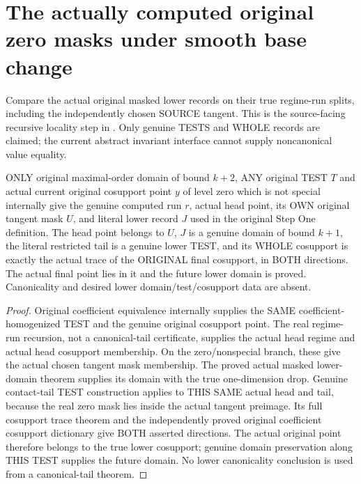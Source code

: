 \section{The actually computed original zero masks under smooth base change}

Compare the actual original masked lower records on their true regime-run
splits, including the independently chosen SOURCE tangent. This is the
source-facing recursive locality step in
\cite[Sections~5 and~7]{bierstone-milman08-functoriality}.
Only genuine TESTS and WHOLE records are claimed; the current abstract
invariant interface cannot supply noncanonical value equality.

\begin{lemma}
\label{hir:original-any-test-actual-computed-zero-mask-history}
\leanok
ONLY original maximal-order domain of bound $k+2$, ANY original TEST $T$
and actual current original cosupport point $y$ of level zero which is not
special internally give the genuine computed run $r$, actual head point,
its OWN original tangent mask $U$, and literal lower record $J$ used in
the original Step One definition. The head point belongs to $U$, $J$ is a
genuine domain of bound $k+1$, the literal restricted tail is a genuine
lower TEST, and its WHOLE cosupport is exactly the actual trace of the
ORIGINAL final cosupport, in BOTH directions. The actual final point lies
in it and the future lower domain is proved. Canonicality and desired
lower domain/test/cosupport data are absent.
\end{lemma}
\begin{proof}
Original coefficient equivalence internally supplies the SAME coefficient-
homogenized TEST and the genuine original cosupport point. The real regime-
run recursion, not a canonical-tail certificate, supplies the actual head
regime and actual head cosupport membership. On the zero/nonspecial branch,
these give the actual chosen tangent mask membership. The proved actual
masked lower-domain theorem supplies its domain with the true one-dimension
drop. Genuine contact-tail TEST construction applies to THIS SAME actual
head and tail, because the real zero mask lies inside the actual tangent
preimage. Its full cosupport trace theorem and the independently proved
original coefficient cosupport dictionary give BOTH asserted directions.
The actual original point therefore belongs to the true lower cosupport;
genuine domain preservation along THIS TEST supplies the future domain.
No lower canonicality conclusion is used from a canonical-tail theorem.
\end{proof}

